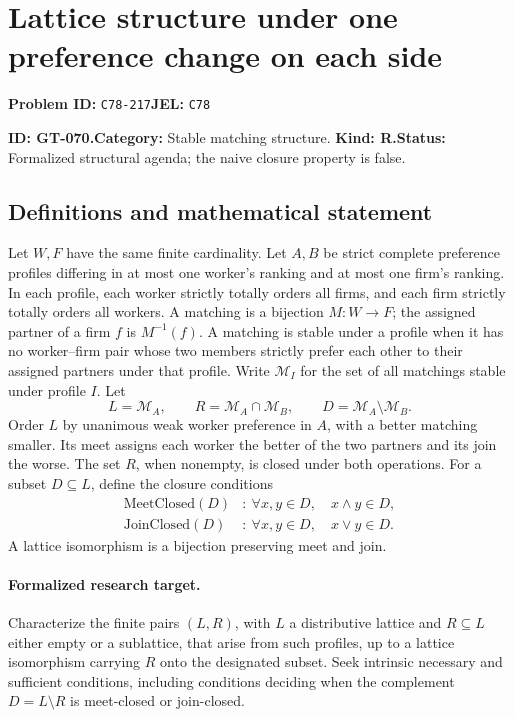 \documentclass[11pt,a4paper]{article}
\begin{document}
\section*{Lattice structure under one preference change on each side}
\textbf{Problem ID:} \texttt{C78-217}\quad \textbf{JEL:} \texttt{C78}\par
\label{problem:OP-0200}
\label{game:GT-070}
{\sffamily\small\color{muted}
\noindent\textbf{ID: GT-070.}\quad\textbf{Category:} Stable matching structure.
\quad\textbf{Kind: R.}\quad\textbf{Status:} Formalized structural agenda;
the naive closure property is false.
\par}
\subsection*{Definitions and mathematical statement}
Let \(W,F\) have the same finite cardinality. Let \(A,B\) be strict
complete preference profiles differing in at most one worker's ranking
and at most one firm's ranking. In each profile, each worker strictly
totally orders all firms, and each firm strictly totally orders all workers.
A matching is a bijection \(M:W\to F\); the assigned partner of a firm
\(f\) is \(M^{-1}(f)\). A matching is stable under a profile when it has
no worker--firm pair whose two members strictly prefer each other to
their assigned partners under that profile. Write \(\mathcal M_I\) for
the set of all matchings stable under profile \(I\). Let
\[
 L=\mathcal M_A,\qquad R=\mathcal M_A\cap\mathcal M_B,\qquad
 D=\mathcal M_A\setminus\mathcal M_B.
\]
Order \(L\) by unanimous weak worker preference in \(A\), with a better
matching smaller. Its meet assigns each worker the better of the two
partners and its join the worse. The set \(R\), when nonempty, is closed
under both operations. For a subset \(D\subseteq L\), define the closure
conditions
\[
 \begin{aligned}
 \mathrm{MeetClosed}(D)&:\ 
       \forall x,y\in D,\quad x\wedge y\in D,\\
 \mathrm{JoinClosed}(D)&:\ 
       \forall x,y\in D,\quad x\vee y\in D.
 \end{aligned}
\]
A lattice isomorphism is a bijection preserving meet and join.

\paragraph{Formalized research target.}
Characterize the finite pairs \((L,R)\), with \(L\) a distributive
lattice and \(R\subseteq L\) either empty or a sublattice, that arise
from such profiles, up to a lattice isomorphism carrying \(R\) onto
the designated subset. Seek intrinsic necessary and sufficient
conditions, including conditions deciding when the complement
\(D=L\setminus R\) is meet-closed or join-closed.
\end{document}
